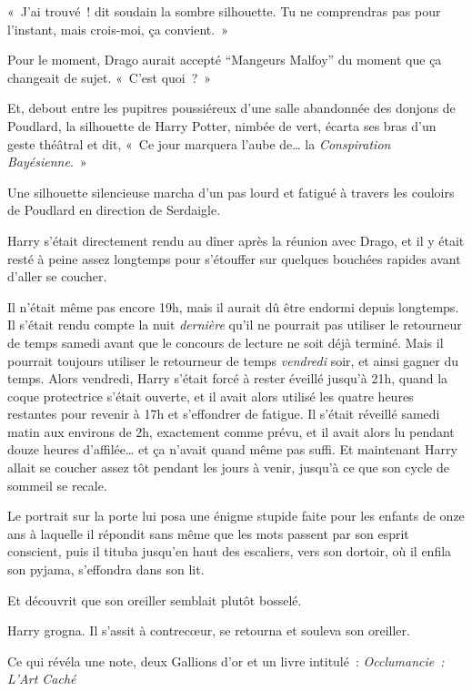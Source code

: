 «~J'ai trouvé~! dit soudain la sombre silhouette.
Tu ne comprendras pas pour l'instant, mais crois-moi, ça convient.~»

Pour le moment, Drago aurait accepté “Mangeurs Malfoy” du moment que ça changeait de sujet.
«~C'est quoi~?~»

Et, debout entre les pupitres poussiéreux d'une salle abandonnée des donjons de Poudlard, la silhouette de Harry Potter, nimbée de vert, écarta ses bras d'un geste théâtral et dit, «~Ce jour marquera l'aube de… la \emph{Conspiration Bayésienne}.~»

\later

Une silhouette silencieuse marcha d'un pas lourd et fatigué à travers les couloirs de Poudlard en direction de Serdaigle.

Harry s'était directement rendu au dîner après la réunion avec Drago, et il y était resté à peine assez longtemps pour s'étouffer sur quelques bouchées rapides avant d'aller se coucher.

Il n'était même pas encore 19h, mais il aurait dû être endormi depuis longtemps.
Il s'était rendu compte la nuit \emph{dernière} qu'il ne pourrait pas utiliser le retourneur de temps samedi avant que le concours de lecture ne soit déjà terminé.
Mais il pourrait toujours utiliser le retourneur de temps \emph{vendredi} soir, et ainsi gagner du temps.
Alors vendredi, Harry s'était forcé à rester éveillé jusqu'à 21h, quand la coque protectrice s'était ouverte, et il avait alors utilisé les quatre heures restantes pour revenir à 17h et s'effondrer de fatigue.
Il s'était réveillé samedi matin aux environs de 2h, exactement comme prévu, et il avait alors lu pendant douze heures d'affilée… et ça n'avait quand même pas suffi.
Et maintenant Harry allait se coucher assez tôt pendant les jours à venir, jusqu'à ce que son cycle de sommeil se recale.

Le portrait sur la porte lui posa une énigme stupide faite pour les enfants de onze ans à laquelle il répondit sans même que les mots passent par son esprit conscient, puis il tituba jusqu'en haut des escaliers, vers son dortoir, où il enfila son pyjama, s'effondra dans son lit.

Et découvrit que son oreiller semblait plutôt bosselé.

Harry grogna.
Il s'assit à contrecœur, se retourna et souleva son oreiller.

Ce qui révéla une note, deux Gallions d'or et un livre intitulé~: \emph{Occlumancie~: L'Art Caché}

